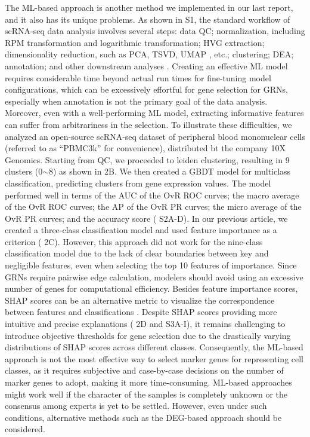 \documentclass{article}
\begin{document}
The ML-based approach is another method we implemented in our last report, and it also has its unique 
problems. As shown in \figurename{ S1}, the standard workflow of scRNA-seq data analysis involves several steps: data \ac{QC}; 
normalization, including \ac{RPM} transformation and logarithmic transformation; 
\ac{HVG} extraction; dimensionality reduction, such as \ac{PCA}, 
\ac{TSVD}, \ac{UMAP} \cite{umap}, 
etc.; clustering; \ac{DEA}; annotation; and other downstream analyses \cite{luecken2019current}. Creating an effective ML model requires 
considerable time beyond actual run times for fine-tuning model configurations, which can be excessively effortful 
for gene selection for GRNs, especially when annotation is not the primary goal of the data analysis. Moreover, even 
with a well-performing ML model, extracting informative features can suffer from arbitrariness in the selection. 
To illustrate these difficulties, we analyzed an open-source scRNA-seq dataset of peripheral blood mononuclear cells 
(referred to as ``PBMC3k'' for convenience), distributed bt the company 10X Genomics. Starting from QC, 
we proceeded to leiden clustering, resulting in 9 clusters (0$\sim$8) as shown in \figurename{ 2B}. We then created a GBDT 
model for multiclass classification, predicting clusters from gene expression values. The model performed well in terms 
of the \ac{AUC} of the \ac{OvR} \ac{ROC} curves; 
the macro average of the OvR ROC curves; the \ac{AP} of the \ac{OvR} \ac{PR} curves; 
the micro average of the OvR PR curves; and the accuracy score (\figurename{ S2A-D}). In our previous article, we created a 
three-class classification model and used feature importance as a criterion (\figurename{ 2C}). However, this approach did 
not work for the nine-class classification model due to the lack of clear boundaries between key and negligible features, 
even when selecting the top 10 features of importance. Since GRNs require pairwise edge calculation, 
modelers should avoid using an excessive number of genes for computational efficiency. Besides feature importance 
scores, \ac{SHAP} scores can be an alternative metric to visualize the correspondence between features 
and classifications \cite{shap}. Despite SHAP scores providing more intuitive and precise explanations 
(\figurename{ 2D and S3A-I}), it remains challenging to introduce objective thresholds for gene selection due to the drastically 
varying distributions of SHAP scores across different classes. Consequently, the ML-based approach is not the most 
effective way to select marker genes for representing cell classes, as it requires subjective and case-by-case decisions on the 
number of marker genes to adopt, making it more time-consuming. ML-based approaches might work well if the 
character of the samples is completely unknown or the consensus among experts is yet to be settled. However, even 
under such conditions, alternative methods such as the DEG-based approach should be considered.
\end{document}
